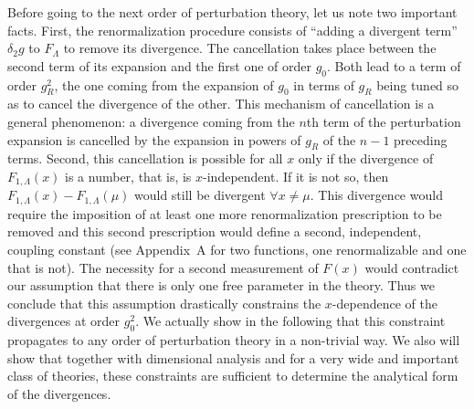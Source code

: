 \documentclass[floatfix,twocolumn,preprintnumbers,amsmath,amssymb,prb]{revtex4}
\begin{document}
Before going to the next order of perturbation theory, let us note
two important facts. First, the renormalization procedure consists
of ``adding a divergent term'' $\delta_2 g$ to $F_\Lambda$ to
remove its divergence. The cancellation takes place between the
second term of its expansion and the first one of order $g_0$.
Both lead to a term of order $g_R^2$, the one coming from the
expansion of $g_0$ in terms of $g_R$ being tuned so as to cancel
the divergence of the other. This mechanism of cancellation is a
general phenomenon: a divergence coming from the
$n$th term of the perturbation expansion is cancelled by the
expansion in powers of $g_R$ of the
$n-1$ preceding terms. Second, this cancellation is 
possible for all $x$ only if the divergence of
$F_{1,\Lambda}(x)$ is a number, that is, is
$x$-independent. If it is not so, then $F_{1,\Lambda}(x) -
F_{1,\Lambda}(\mu)$ would still be divergent $\forall x\ne\mu$.
This divergence would require the imposition of at least one
more renormalization prescription to be removed
and this second prescription would define a second, independent,
coupling constant (see Appendix~A for two functions, one 
renormalizable and one that is not). The necessity for a second
measurement of $F(x)$ would 
contradict our assumption that there is only one free parameter in
the theory. Thus we conclude that this assumption drastically
constrains the $x$-dependence of the divergences at order $g_0^2$.
We actually show in the following that this constraint propagates
to any order of perturbation theory in a non-trivial way. We also
will show that together with dimensional analysis and for a very
wide and important class of theories, these constraints are
sufficient to determine the analytical form of the divergences.
\end{document}
